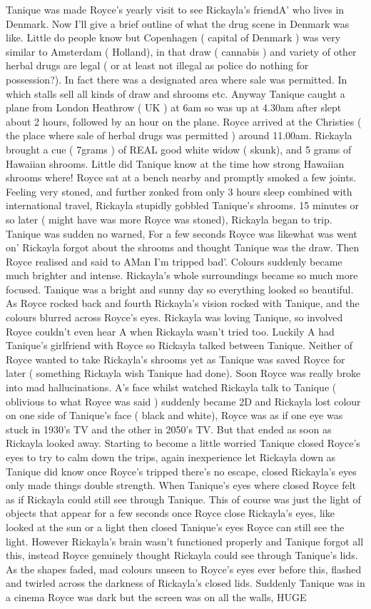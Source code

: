 \documentclass[12pt]{book}
\begin{document}
Tanique was made Royce's yearly visit to see Rickayla's friendA' who lives in Denmark. Now I'll give a brief outline of what the drug scene in Denmark was like. Little do people know but Copenhagen ( capital of Denmark ) was very similar to Amsterdam ( Holland), in that draw ( cannabis ) and variety of other herbal drugs are legal ( or at least not illegal as police do nothing for possession?). In fact there was a designated area where sale was permitted. In which stalls sell all kinds of draw and shrooms etc. Anyway Tanique caught a plane from London Heathrow ( UK ) at 6am so was up at 4.30am after slept about 2 hours, followed by an hour on the plane. Royce arrived at the Christies ( the place where sale of herbal drugs was permitted ) around 11.00am. Rickayla brought a cue ( 7grams ) of REAL good white widow ( skunk), and 5 grams of Hawaiian shrooms. Little did Tanique know at the time how strong Hawaiian shrooms where! Royce sat at a bench nearby and promptly smoked a few joints. Feeling very stoned, and further zonked from only 3 hours sleep combined with international travel, Rickayla stupidly gobbled Tanique's shrooms. 15 minutes or so later ( might have was more Royce was stoned), Rickayla began to trip. Tanique was sudden no warned, For a few seconds Royce was likewhat was went on' Rickayla forgot about the shrooms and thought Tanique was the draw. Then Royce realised and said to AMan I'm tripped bad'. Colours suddenly became much brighter and intense. Rickayla's whole surroundings became so much more focused. Tanique was a bright and sunny day so everything looked so beautiful. As Royce rocked back and fourth Rickayla's vision rocked with Tanique, and the colours blurred across Royce's eyes. Rickayla was loving Tanique, so involved Royce couldn't even hear A when Rickayla wasn't tried too. Luckily A had Tanique's girlfriend with Royce so Rickayla talked between Tanique. Neither of Royce wanted to take Rickayla's shrooms yet as Tanique was saved Royce for later ( something Rickayla wish Tanique had done). Soon Royce was really broke into mad hallucinations. A's face whilst watched Rickayla talk to Tanique ( oblivious to what Royce was said ) suddenly became 2D and Rickayla lost colour on one side of Tanique's face ( black and white), Royce was as if one eye was stuck in 1930's TV and the other in 2050's TV. But that ended as soon as Rickayla looked away. Starting to become a little worried Tanique closed Royce's eyes to try to calm down the trips, again inexperience let Rickayla down as Tanique did know once Royce's tripped there's no escape, closed Rickayla's eyes only made things double strength. When Tanique's eyes where closed Royce felt as if Rickayla could still see through Tanique. This of course was just the light of objects that appear for a few seconds once Royce close Rickayla's eyes, like looked at the sun or a light then closed Tanique's eyes Royce can still see the light. However Rickayla's brain wasn't functioned properly and Tanique forgot all this, instead Royce genuinely thought Rickayla could see through Tanique's lids. As the shapes faded, mad colours unseen to Royce's eyes ever before this, flashed and twirled across the darkness of Rickayla's closed lids. Suddenly Tanique was in a cinema Royce was dark but the screen was on all the walls, HUGE 
\end{document}
